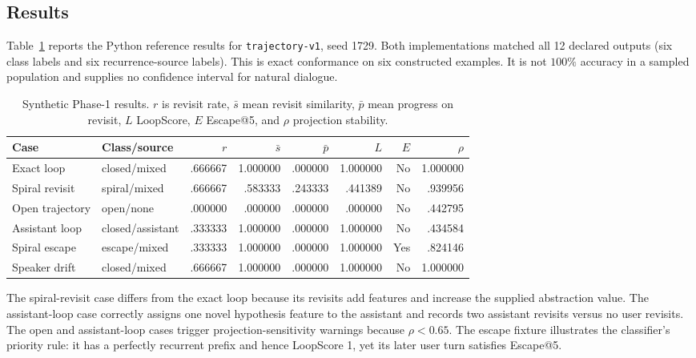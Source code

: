 \documentclass[11pt]{article}
\newcommand{\code}[1]{\texttt{#1}}
\begin{document}
\subsection{Results}

Table~\ref{tab:synthetic} reports the Python reference results for
\code{trajectory-v1}, seed 1729. Both implementations matched all 12 declared
outputs (six class labels and six recurrence-source labels). This is exact
conformance on six constructed examples. It is not $100\%$ accuracy in a sampled
population and supplies no confidence interval for natural dialogue.

\begin{table}[t]
\centering
\small
\caption{Synthetic Phase-1 results. $r$ is revisit rate, $\bar{s}$ mean revisit
similarity, $\bar{p}$ mean progress on revisit, $L$ LoopScore, $E$ Escape@5, and
$\rho$ projection stability.}
\label{tab:synthetic}
\begin{tabular}{llrrrrrr}
\toprule
Case & Class/source & $r$ & $\bar{s}$ & $\bar{p}$ & $L$ & $E$ & $\rho$ \\
\midrule
Exact loop & closed/mixed & .666667 & 1.000000 & .000000 & 1.000000 & No  & 1.000000 \\
Spiral revisit & spiral/mixed & .666667 & .583333 & .243333 & .441389 & No & .939956 \\
Open trajectory & open/none & .000000 & .000000 & .000000 & .000000 & No & .442795 \\
Assistant loop & closed/assistant & .333333 & 1.000000 & .000000 & 1.000000 & No & .434584 \\
Spiral escape & escape/mixed & .333333 & 1.000000 & .000000 & 1.000000 & Yes & .824146 \\
Speaker drift & closed/mixed & .666667 & 1.000000 & .000000 & 1.000000 & No & 1.000000 \\
\bottomrule
\end{tabular}
\end{table}

The spiral-revisit case differs from the exact loop because its revisits add
features and increase the supplied abstraction value. The assistant-loop case
correctly assigns one novel hypothesis feature to the assistant and records two
assistant revisits versus no user revisits. The open and assistant-loop cases
trigger projection-sensitivity warnings because $\rho<0.65$. The escape fixture
illustrates the classifier's priority rule: it has a perfectly recurrent prefix
and hence LoopScore 1, yet its later user turn satisfies Escape@5.
\end{document}
